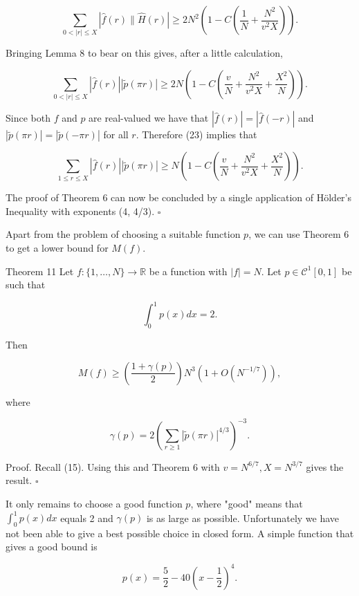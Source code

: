 \documentclass[10pt]{article}
\begin{document}
$$
\sum_{0<|r| \leq X}|\hat{f}(r) \| \hat{H}(r)| \geq 2 N^{2}\left(1-C\left(\frac{1}{N}+\frac{N^{2}}{v^{2} X}\right)\right) .
$$

Bringing Lemma 8 to bear on this gives, after a little calculation,


\begin{equation*}
\sum_{0<|r| \leq X}|\hat{f}(r)||\tilde{p}(\pi r)| \geq 2 N\left(1-C\left(\frac{v}{N}+\frac{N^{2}}{v^{2} X}+\frac{X^{2}}{N}\right)\right) . \tag{23}
\end{equation*}


Since both $f$ and $p$ are real-valued we have that $|\hat{f}(r)|=|\hat{f}(-r)|$ and $|\tilde{p}(\pi r)|=|\tilde{p}(-\pi r)|$ for all $r$. Therefore (23) implies that


\begin{equation*}
\sum_{1 \leq r \leq X}|\hat{f}(r)||\tilde{p}(\pi r)| \geq N\left(1-C\left(\frac{v}{N}+\frac{N^{2}}{v^{2} X}+\frac{X^{2}}{N}\right)\right) . \tag{24}
\end{equation*}


The proof of Theorem 6 can now be concluded by a single application of Hölder's Inequality with exponents (4, 4/3). \(\square\)

Apart from the problem of choosing a suitable function $p$, we can use Theorem 6 to get a lower bound for $M(f)$.

Theorem 11 Let $f:\{1, \ldots, N\} \rightarrow \mathbb{R}$ be a function with $|f|=N$. Let $p \in \mathcal{C}^{1}[0,1]$ be such that

$$
\int_{0}^{1} p(x) d x=2 .
$$

Then

$$
M(f) \geq\left(\frac{1+\gamma(p)}{2}\right) N^{3}\left(1+O\left(N^{-1 / 7}\right)\right),
$$

where

$$
\gamma(p)=2\left(\sum_{r \geq 1}|\tilde{p}(\pi r)|^{4 / 3}\right)^{-3} .
$$

Proof. Recall (15). Using this and Theorem 6 with $v=N^{6 / 7}, X=N^{3 / 7}$ gives the result. \(\square\)

It only remains to choose a good function $p$, where "good" means that $\int_{0}^{1} p(x) d x$ equals 2 and $\gamma(p)$ is as large as possible. Unfortunately we have not been able to give a best possible choice in closed form. A simple function that gives a good bound is


\begin{equation*}
p(x)=\frac{5}{2}-40\left(x-\frac{1}{2}\right)^{4} . \tag{25}
\end{equation*}
\end{document}
